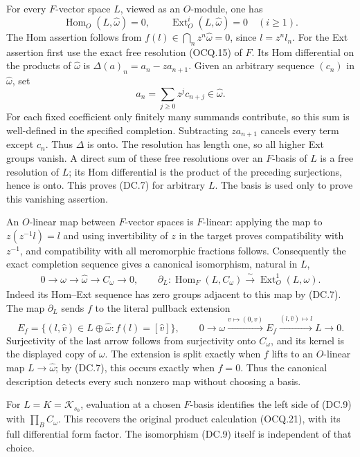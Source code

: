 For every $F$-vector space $L$, viewed as an $O$-module, one has
\[
 \operatorname{Hom}_O(L,\widehat\omega)=0,
 \qquad \operatorname{Ext}^i_O(L,\widehat\omega)=0\quad(i\ge1).
 \tag{DC.7}
\]
The Hom assertion follows from
$f(l)\in\bigcap_nz^n\widehat\omega=0$, since $l=z^nl_n$.
For the Ext assertion first use the exact free resolution (OCQ.15)
of $F$.  Its Hom differential on the products of
$\widehat\omega$ is
$\Delta(a)_n=a_n-za_{n+1}$.  Given an arbitrary sequence
$(c_n)$ in $\widehat\omega$, set
\[
 a_n=\sum_{j\ge0}z^jc_{n+j}\in\widehat\omega.
 \tag{DC.8}
\]
For each fixed coefficient only finitely many summands contribute,
so this sum is well-defined in the specified completion.
Subtracting $za_{n+1}$ cancels every term except $c_n$.
Thus $\Delta$ is onto.  The resolution has length one, so all
higher Ext groups vanish.  A direct sum of these free resolutions
over an $F$-basis of $L$ is a free resolution of $L$; its Hom
differential is the product of the preceding surjections, hence
is onto.  This proves (DC.7) for arbitrary $L$.  The basis is used
only to prove this vanishing assertion.

An $O$-linear map between $F$-vector spaces is $F$-linear: applying
the map to $z(z^{-1}l)=l$ and using invertibility of $z$ in the
target proves compatibility with $z^{-1}$, and compatibility with
all meromorphic fractions follows.  Consequently the exact
completion sequence gives a canonical isomorphism, natural in $L$,
\[
 \begin{split}
 0\longrightarrow\omega\longrightarrow\widehat\omega
       \longrightarrow C_\omega\longrightarrow0,
 \qquad
 \partial_L:\operatorname{Hom}_F(L,C_\omega)
          \xrightarrow{\sim}\operatorname{Ext}^1_O(L,\omega).
 \end{split}
 \tag{DC.9}
\]
Indeed its Hom--Ext sequence has zero groups adjacent to this map
by (DC.7).  The map $\partial_L$ sends $f$ to the literal pullback
extension
\[
 E_f=\{(l,\widehat v)\in L\oplus\widehat\omega:
                      f(l)=[\widehat v]\},\qquad
 0\to\omega\xrightarrow{v\mapsto(0,v)}E_f
       \xrightarrow{(l,\widehat v)\mapsto l}L\to0.
 \tag{DC.10}
\]
Surjectivity of the last arrow follows from surjectivity onto
$C_\omega$, and its kernel is the displayed copy of $\omega$.
The extension is split exactly when $f$ lifts to an $O$-linear
map $L\to\widehat\omega$; by (DC.7), this occurs exactly when
$f=0$.  Thus the canonical description detects every such nonzero
map without choosing a basis.

For $L=K=\mathcal K_{s_0}$, evaluation at a chosen $F$-basis
identifies the left side of (DC.9) with
$\prod_B C_\omega$.  This recovers the original product calculation
(OCQ.21), with its full differential form factor.  The isomorphism
(DC.9) itself is independent of that choice.

